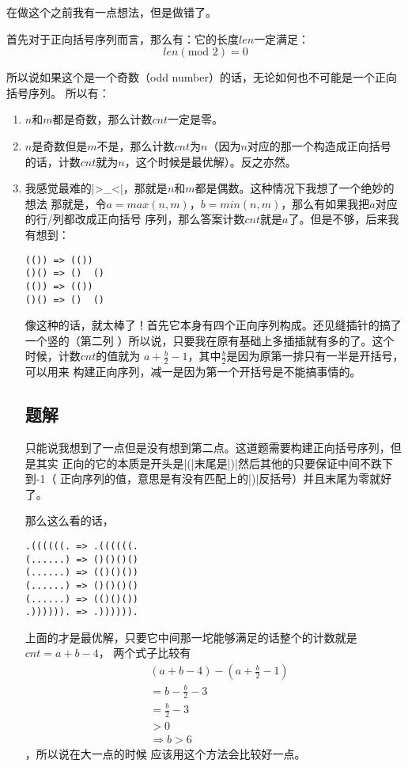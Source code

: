 在做这个之前我有一点想法，但是做错了。

首先对于正向括号序列而言，那么有：它的长度$len$一定满足：%
$$len (\text{mod } 2) = 0$$

所以说如果这个是一个奇数（odd number）的话，无论如何也不可能是一个正向括号序列。
所以有：

\begin{enumerate}
\item $n$和$m$都是奇数，那么计数$cnt$一定是零。
\item $n$是奇数但是$m$不是，那么计数$cnt$为$n$（因为$n$对应的那一个构造成正向括号
的话，计数$cnt$就为$n$，这个时候是最优解）。反之亦然。
\item 我感觉最难的\vb|>_<|，那就是$n$和$m$都是偶数。这种情况下我想了一个绝妙的想法
那就是，令$a=max(n, m)$，$b=min(n,m)$，那么有如果我把$a$对应的行/列都改成正向括号
序列，那么答案计数$cnt$就是$a$了。但是不够，后来我有想到：
\begin{lstlisting}
(()) => (())
()() => ()  ()
(()) => (())
()() => ()  ()
\end{lstlisting}

像这种的话，就太棒了！首先它本身有四个正向序列构成。还见缝插针的搞了一个竖的（第二列
）所以说，只要我在原有基础上多插插就有多的了。这个时候，计数$cnt$的值就为%
$a+\frac{b}{2}-1$，其中$\frac{b}{2}$是因为原第一排只有一半是开括号，可以用来
构建正向序列，减一是因为第一个开括号是不能搞事情的。

\subsection{题解}

只能说我想到了一点但是没有想到第二点。这道题需要构建正向括号序列，但是其实
正向的它的本质是开头是\vb|(|末尾是\vb|)|然后其他的只要保证中间不跌下到-1（
正向序列的值，意思是有没有匹配上的\vb|)|反括号）并且末尾为零就好了。

那么这么看的话，
\begin{lstlisting}
.((((((. => .((((((.
(......) => ()()()()
(......) => (()()())
(......) => ()()()()
(......) => (()()())
.)))))). => .)))))).
\end{lstlisting}

上面的才是最优解，只要它中间那一坨能够满足的话整个的计数就是$cnt=a+b-4$，
两个式子比较有\begin{align}&(a+b-4)-(a+\frac{b}{2}-1)\\&=b-\frac{b}{2}-3\\
&=\frac{b}{2}-3\\&>0\\&\Longrightarrow b>6\end{align}，所以说在大一点的时候
应该用这个方法会比较好一点。

\end{enumerate}
